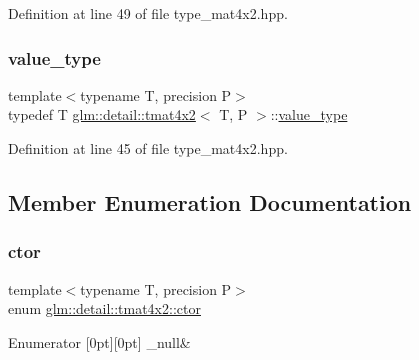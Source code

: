 Definition at line 49 of file type\+\_\+mat4x2.\+hpp.

\mbox{\label{structglm_1_1detail_1_1tmat4x2_a69ee68b76c63d5e19001223eb5e7e968}} 
\subsubsection{\texorpdfstring{value\+\_\+type}{value\_type}}
{\footnotesize\ttfamily template$<$typename T, precision P$>$ \\
typedef T \hyperlink{structglm_1_1detail_1_1tmat4x2}{glm\+::detail\+::tmat4x2}$<$ T, P $>$\+::\hyperlink{structglm_1_1detail_1_1tmat4x2_a69ee68b76c63d5e19001223eb5e7e968}{value\+\_\+type}}



Definition at line 45 of file type\+\_\+mat4x2.\+hpp.



\subsection{Member Enumeration Documentation}
\mbox{\label{structglm_1_1detail_1_1tmat4x2_a4266befa296229458f2652dcc4ba4a72}} 
\subsubsection{\texorpdfstring{ctor}{ctor}}
{\footnotesize\ttfamily template$<$typename T, precision P$>$ \\
enum \hyperlink{structglm_1_1detail_1_1tmat4x2_a4266befa296229458f2652dcc4ba4a72}{glm\+::detail\+::tmat4x2\+::ctor}}

\begin{DoxyEnumFields}{Enumerator}
[0pt][0pt]{}\mbox{\label{structglm_1_1detail_1_1tmat4x2_a4266befa296229458f2652dcc4ba4a72a75a9b723374baa541fbed868699bdd13}} 
\+\_\+null&\\
\hline

\end{DoxyEnumFields}


